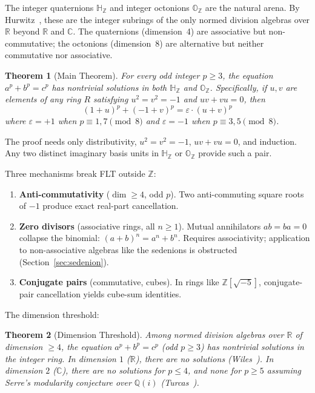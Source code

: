 \documentclass[11pt]{amsart}
\theoremstyle{plain}
\newtheorem{theorem}{Theorem}[section]
\theoremstyle{definition}
\theoremstyle{remark}
\newcommand{\Z}{\mathbb{Z}}
\newcommand{\Q}{\mathbb{Q}}
\newcommand{\R}{\mathbb{R}}
\newcommand{\C}{\mathbb{C}}
\newcommand{\HH}{\mathbb{H}}
\newcommand{\OO}{\mathbb{O}}
\begin{document}
The integer quaternions $\HH_\Z$ and integer octonions $\OO_\Z$ are the natural arena.
By Hurwitz~\cite{Hurwitz1898}, these are the integer subrings of the only
normed division algebras over $\R$ beyond $\R$ and $\C$.
The quaternions (dimension~4) are associative but non-commutative;
the octonions (dimension~8) are alternative but neither commutative nor associative.

\begin{theorem}[Main Theorem]\label{thm:main}
For every odd integer $p \geq 3$, the equation $a^p + b^p = c^p$
has nontrivial solutions in both $\HH_\Z$ and $\OO_\Z$.
Specifically, if $u, v$ are elements of any ring $R$ satisfying
$u^2 = v^2 = -1$ and $uv + vu = 0$, then
\[
  (1+u)^p + (-1+v)^p = \varepsilon \cdot (u+v)^p
\]
where $\varepsilon = +1$ when $p \equiv 1, 7 \pmod{8}$ and
$\varepsilon = -1$ when $p \equiv 3, 5 \pmod{8}$.
\end{theorem}

The proof needs only distributivity, $u^2 = v^2 = -1$, $uv + vu = 0$,
and induction.
Any two distinct imaginary basis units in $\HH_\Z$ or $\OO_\Z$ provide such a pair.

Three mechanisms break FLT outside $\Z$:
\begin{enumerate}[label=(\Alph*)]
  \item \textbf{Anti-commutativity} ($\dim \geq 4$, odd $p$).
    Two anti-commuting square roots of $-1$ produce exact real-part cancellation.
  \item \textbf{Zero divisors} (associative rings, all $n \geq 1$).
    Mutual annihilators $ab = ba = 0$ collapse the binomial: $(a+b)^n = a^n + b^n$.
    Requires associativity; application to non-associative algebras like the sedenions
    is obstructed (Section~\ref{sec:sedenion}).
  \item \textbf{Conjugate pairs} (commutative, cubes).
    In rings like $\Z[\sqrt{-5}]$, conjugate-pair cancellation yields cube-sum identities.
\end{enumerate}

The dimension threshold:

\begin{theorem}[Dimension Threshold]\label{thm:dim}
Among normed division algebras over $\R$ of dimension $\geq 4$, the equation
$a^p + b^p = c^p$ (odd $p \geq 3$) has nontrivial solutions in the integer ring.
In dimension $1$ ($\R$), there are no solutions (Wiles~\cite{Wiles1995}).
In dimension $2$ ($\C$), there are no solutions for $p \leq 4$, and none for
$p \geq 5$ assuming Serre's modularity conjecture over $\Q(i)$
(Turcas~\cite{Turcas2018}).
\end{theorem}
\end{document}
